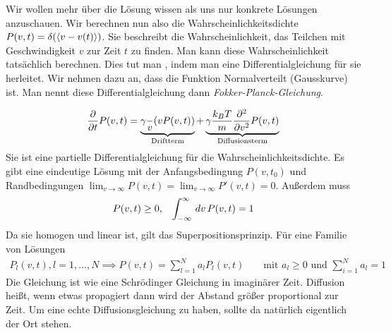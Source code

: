 Wir wollen mehr über die Lösung wissen als uns nur konkrete Lösungen anzuschauen.
Wir berechnen nun also die Wahrscheinlichkeitsdichte $P(v,t) = \delta(\Braket{v - v(t)})$.
Sie beschreibt die Wahrscheinlichkeit, das Teilchen mit Geschwindigkeit $v$
zur Zeit $t$ zu finden. Man kann diese Wahrscheinlichkeit tatsächlich berechnen.
Dies tut man , indem man eine Differentialgleichung für sie herleitet.
Wir nehmen dazu an, dass die Funktion Normalverteilt (Gausskurve) ist.
Man nennt diese Differentialgleichung dann \emph{Fokker-Planck-Gleichung}.

%
\begin{align*}
  \frac{\partial  }{\partial t}P(v,t) = \underbrace{\gamma \frac{}{v}(v P(v,t))}_{\text{Driftterm}}+ \underbrace{\gamma \frac{k_B T}{m}
  \frac{\partial ^2 }{\partial v^2} P(v,t)
}_{\text{Diffusionsterm}}\end{align*}
%
Sie ist eine partielle Differentialgleichung für die Wahrscheinlichkeitsdichte.
Es gibt eine eindeutige Lösung mit der Anfangsbedingung $P(v, t_0)$ und Randbedingungen
$ \lim_{v\to \infty} P(v,t) = \lim_{v\to \infty} P'(v,t) = 0$.
Außerdem muss
%
\begin{align*}
  P(v,t) \ge 0, && \int_{-\infty}^{\infty} \,dv\, P(v,t) = 1
\end{align*}
%
Da sie homogen und linear ist, gilt das Superpositionsprinzip. Für eine Familie
von Lösungen
%
\begin{align*}
  P_l(v,t), l = 1, \ldots , N \implies P(v,t) = \sum_{l=1}^{N} a_l P_l(v,t) &&
  \text{ mit } a_l \ge 0 \text{ und } \sum_{i=1}^{N} a_l = 1
\end{align*}
%
Die Gleichung ist wie eine Schrödinger Gleichung in imaginärer Zeit.
Diffusion heißt, wenn etwas propagiert dann wird der Abstand größer proportional
zur Zeit. Um eine echte Diffusionsgleichung zu haben, sollte da natürlich eigentlich
der Ort stehen.

